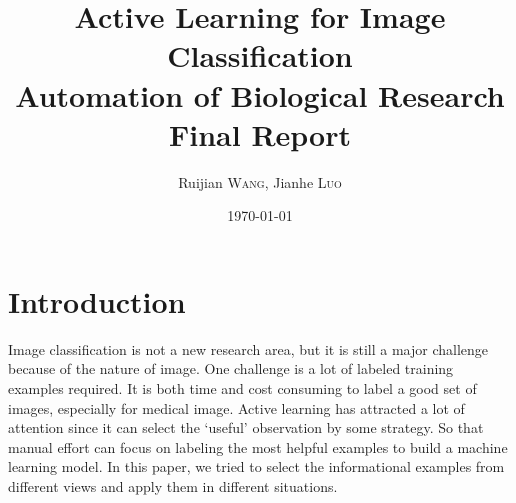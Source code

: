 \documentclass{article}
\title{Active Learning for Image Classification \\ Automation of Biological Research \\ Final Report} %
\author{Ruijian \textsc{Wang}, Jianhe \textsc{Luo}} %
\date{\today} %
\begin{document}
\maketitle %





\section{Introduction}

Image classification is not a new research area, but it is still a major challenge because of the nature of image. One challenge is a lot of labeled training examples required. It is both time and cost consuming to label a good set of images, especially for medical image. Active learning has attracted a lot of attention since it can select the `useful' observation by some strategy. So that manual effort can focus on labeling the most helpful examples to build a machine learning model. In this paper, we tried to select the informational examples from different views and apply them in different situations.



\end{document}
